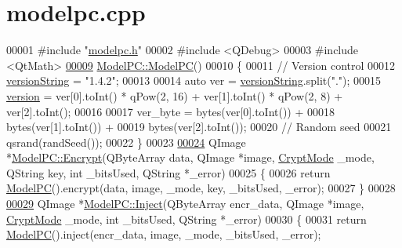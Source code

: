 \hypertarget{modelpc_8cpp_source}{}\section{modelpc.\+cpp}
\label{modelpc_8cpp_source}

\begin{DoxyCode}
00001 \textcolor{preprocessor}{#include "\hyperlink{modelpc_8h}{modelpc.h}"}
00002 \textcolor{preprocessor}{#include <QDebug>}
00003 \textcolor{preprocessor}{#include <QtMath>}
\hypertarget{modelpc_8cpp_source.tex_l00009}{}\hyperlink{class_model_p_c_ae12ebe65ec973c02a0de4850a7c1e31c}{00009} \hyperlink{class_model_p_c_ae12ebe65ec973c02a0de4850a7c1e31c}{ModelPC::ModelPC}()
00010 \{
00011     \textcolor{comment}{// Version control}
00012     \hyperlink{class_model_p_c_a5f426725ccf7eefd3c77ea8c720264c9}{versionString} = \textcolor{stringliteral}{"1.4.2"};
00013 
00014     \textcolor{keyword}{auto} ver = \hyperlink{class_model_p_c_a5f426725ccf7eefd3c77ea8c720264c9}{versionString}.split(\textcolor{stringliteral}{"."});
00015     \hyperlink{class_model_p_c_a5af48ab89e19be42a94c34ba00249401}{version} = ver[0].toInt() * qPow(2, 16) + ver[1].toInt() * qPow(2, 8) + ver[2].toInt();
00016 
00017     ver\_byte = bytes(ver[0].toInt()) +
00018             bytes(ver[1].toInt()) +
00019             bytes(ver[2].toInt());
00020     \textcolor{comment}{// Random seed}
00021     qsrand(randSeed());
00022 \}
00023 
\hypertarget{modelpc_8cpp_source.tex_l00024}{}\hyperlink{class_model_p_c_aad427b77cf44b5dadc5523ea03272c85}{00024} QImage *\hyperlink{class_model_p_c_aad427b77cf44b5dadc5523ea03272c85}{ModelPC::Encrypt}(QByteArray data, QImage *image, 
      \hyperlink{class_model_p_c_a296dd7afe3e1c49b3da25fd644fe4ceb}{CryptMode} \_mode, QString key, \textcolor{keywordtype}{int} \_bitsUsed, QString *\_error)
00025 \{
00026     \textcolor{keywordflow}{return} \hyperlink{class_model_p_c_ae12ebe65ec973c02a0de4850a7c1e31c}{ModelPC}().encrypt(data, image, \_mode, key, \_bitsUsed, \_error);
00027 \}
00028 
\hypertarget{modelpc_8cpp_source.tex_l00029}{}\hyperlink{class_model_p_c_a11c3709b87ca83bce474d377f35660ac}{00029} QImage *\hyperlink{class_model_p_c_a11c3709b87ca83bce474d377f35660ac}{ModelPC::Inject}(QByteArray encr\_data, QImage *image, 
      \hyperlink{class_model_p_c_a296dd7afe3e1c49b3da25fd644fe4ceb}{CryptMode} \_mode, \textcolor{keywordtype}{int} \_bitsUsed, QString *\_error)
00030 \{
00031     \textcolor{keywordflow}{return} \hyperlink{class_model_p_c_ae12ebe65ec973c02a0de4850a7c1e31c}{ModelPC}().inject(encr\_data, image, \_mode, \_bitsUsed, \_error);

\end{DoxyCode}
